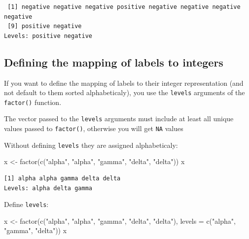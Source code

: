 \documentclass[
]{book}
\newenvironment{Shaded}{\begin{snugshade}}{\end{snugshade}}
\newcommand{\AttributeTok}[1]{\textcolor[rgb]{0.77,0.63,0.00}{#1}}
\newcommand{\FunctionTok}[1]{\textcolor[rgb]{0.00,0.00,0.00}{#1}}
\newcommand{\NormalTok}[1]{#1}
\newcommand{\OtherTok}[1]{\textcolor[rgb]{0.56,0.35,0.01}{#1}}
\newcommand{\StringTok}[1]{\textcolor[rgb]{0.31,0.60,0.02}{#1}}
\begin{document}
\begin{verbatim}
 [1] negative negative negative positive negative negative negative negative
 [9] positive negative
Levels: positive negative
\end{verbatim}

\hypertarget{defining-the-mapping-of-labels-to-integers}{%
\subsection{Defining the mapping of labels to integers}\label{defining-the-mapping-of-labels-to-integers}}

If you want to define the mapping of labels to their integer representation (and not default to them sorted alphabeticaly), you use the \texttt{levels} arguments of the \texttt{factor()} function.

The vector passed to the \texttt{levels} arguments must include at least all unique values passed to \texttt{factor()}, otherwise you will get \texttt{NA} values

Without defining \texttt{levels} they are assigned alphabeticaly:

\begin{Shaded}
\begin{Highlighting}[]
\NormalTok{x }\OtherTok{\textless{}{-}} \FunctionTok{factor}\NormalTok{(}\FunctionTok{c}\NormalTok{(}\StringTok{"alpha"}\NormalTok{, }\StringTok{"alpha"}\NormalTok{, }\StringTok{"gamma"}\NormalTok{, }\StringTok{"delta"}\NormalTok{, }\StringTok{"delta"}\NormalTok{))}
\NormalTok{x}
\end{Highlighting}
\end{Shaded}

\begin{verbatim}
[1] alpha alpha gamma delta delta
Levels: alpha delta gamma
\end{verbatim}

Define \texttt{levels}:

\begin{Shaded}
\begin{Highlighting}[]
\NormalTok{x }\OtherTok{\textless{}{-}} \FunctionTok{factor}\NormalTok{(}\FunctionTok{c}\NormalTok{(}\StringTok{"alpha"}\NormalTok{, }\StringTok{"alpha"}\NormalTok{, }\StringTok{"gamma"}\NormalTok{, }\StringTok{"delta"}\NormalTok{, }\StringTok{"delta"}\NormalTok{),}
 \AttributeTok{levels =} \FunctionTok{c}\NormalTok{(}\StringTok{"alpha"}\NormalTok{, }\StringTok{"gamma"}\NormalTok{, }\StringTok{"delta"}\NormalTok{))}
\NormalTok{x}
\end{Highlighting}
\end{Shaded}
\end{document}
